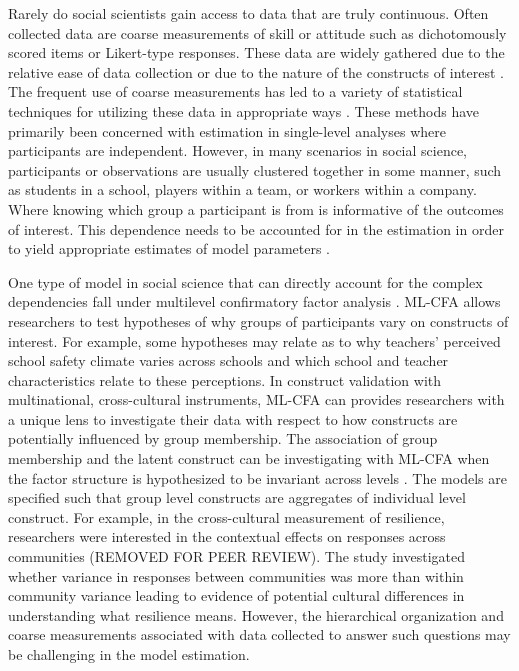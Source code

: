 \documentclass[Review,sageh,times, doublespace]{sagej}
\begin{document}
Rarely do social scientists gain access to data that are truly continuous.
Often collected data are coarse measurements of skill or attitude such as dichotomously scored items or Likert-type responses.
These data are widely gathered due to the relative ease of data collection or due to the nature of the constructs of interest \citep{DeVellis2016, Fowler2013}.
The frequent use of coarse measurements has led to a variety of statistical techniques for utilizing these data in appropriate ways \citep{Bandalos2014, Asparouhov2007, Satorra1994, Muthen1984, Muthen1978}.
These methods have primarily been concerned with estimation in single-level analyses where participants are independent.
However, in many scenarios in social science, participants or observations are usually clustered together in some manner, such as students in a school, players within a team, or workers within a company.
Where knowing which group a participant is from is informative of the outcomes of interest.
This dependence needs to be accounted for in the estimation in order to yield appropriate estimates of model parameters \citep{Stapleton2013}. 

One type of model in social science that can directly account for the complex dependencies fall under multilevel confirmatory factor analysis \citep[ML-CFA;][]{Goldstein1988, Muthen1994}.
ML-CFA allows researchers to test hypotheses of why groups of participants vary on constructs of interest.
For example, some hypotheses may relate as to why teachers' perceived school safety climate varies across schools and which school and teacher characteristics relate to these perceptions.
In construct validation with multinational, cross-cultural instruments, ML-CFA can provides researchers with a unique lens to investigate their data with respect to how constructs are potentially influenced by group membership.
The association of group membership and the latent construct can be investigating with ML-CFA when the factor structure is hypothesized to be invariant across levels \citep[][Models 4-5, pg. 488]{Stapleton2016}.
The models are specified such that group level constructs are aggregates of individual level construct.
For example, in the cross-cultural measurement of resilience, researchers were interested in the contextual effects on responses across communities (REMOVED FOR PEER REVIEW).%
The study investigated whether variance in responses between communities was more than within community variance leading to evidence of potential cultural differences in understanding what resilience means.
However, the hierarchical organization and coarse measurements associated with data collected to answer such questions may be challenging in the model estimation.
\end{document}
